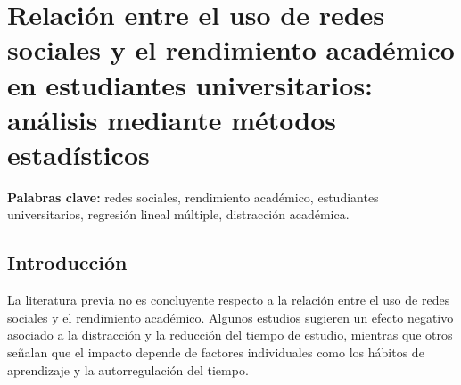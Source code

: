 \documentclass[12pt]{article}
\begin{document}
\newpage
\section*{Relación entre el uso de redes sociales y el rendimiento académico en estudiantes universitarios: análisis mediante métodos estadísticos}

\begin{abstract}
Esta investigación analiza la relación entre el uso de redes sociales y el rendimiento académico en estudiantes universitarios, incorporando además la distracción académica, las horas de estudio y la asistencia como variables explicativas. Se empleó una base de datos de estudiantes con información sobre promedio académico y hábitos de uso de redes sociales y estudio.

La metodología combina análisis descriptivo, correlaciones de Pearson y Spearman, pruebas de comparación de grupos (t de Welch, ANOVA y Kruskal-Wallis) y un modelo de regresión lineal múltiple con término de interacción entre uso de redes y distracción académica.

Los resultados muestran una asociación negativa débil pero estadísticamente significativa entre el uso de redes sociales y el rendimiento académico. Sin embargo, las comparaciones por grupos no detectan diferencias significativas, lo que sugiere pérdida de información al discretizar la variable. El modelo de regresión es globalmente significativo y explica aproximadamente un 18.4\% de la variabilidad del rendimiento. En este, las horas de estudio y la asistencia presentan efectos positivos, mientras que el uso de redes sociales y la distracción académica se asocian negativamente. La interacción entre ambas variables no resulta significativa.

En conclusión, el rendimiento académico parece depender de múltiples factores, siendo el efecto del uso de redes sociales estadísticamente detectable pero limitado, y no suficiente por sí solo para explicar el desempeño académico.
\end{abstract}

\textbf{Palabras clave:} redes sociales, rendimiento académico, estudiantes universitarios, regresión lineal múltiple, distracción académica.

\subsection*{Introducción}
La literatura previa no es concluyente respecto a la relación entre el uso de redes sociales y el rendimiento académico. Algunos estudios sugieren un efecto negativo asociado a la distracción y la reducción del tiempo de estudio, mientras que otros señalan que el impacto depende de factores individuales como los hábitos de aprendizaje y la autorregulación del tiempo.\\
\end{document}
